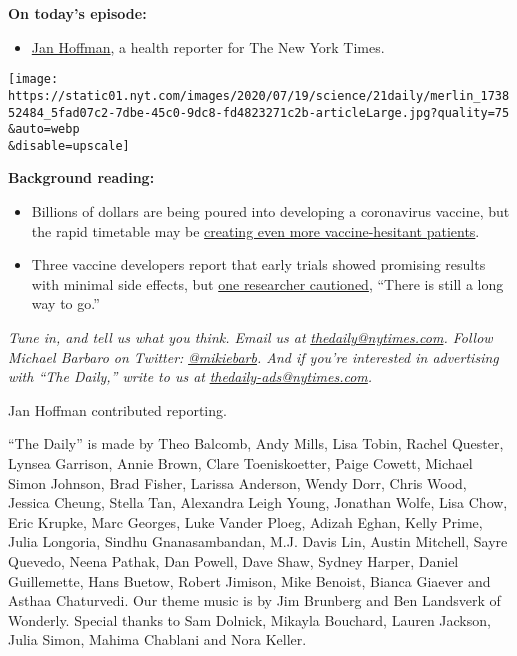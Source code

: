 \textbf{On today's episode:}

\begin{itemize}
\tightlist
\item
  \href{https://www.nytimes.com/by/jan-hoffman}{Jan Hoffman}, a health
  reporter for The New York Times.
\end{itemize}

\texttt{[image: https://static01.nyt.com/images/2020/07/19/science/21daily/merlin\_173852484\_5fad07c2-7dbe-45c0-9dc8-fd4823271c2b-articleLarge.jpg?quality=75\\\&auto=webp\\\&disable=upscale]}

\textbf{Background reading:}

\begin{itemize}
\item
  Billions of dollars are being poured into developing a coronavirus
  vaccine, but the rapid timetable may be
  \href{https://www.nytimes.com/2020/07/18/health/coronavirus-anti-vaccine.html}{creating
  even more vaccine-hesitant patients}.
\item
  Three vaccine developers report that early trials showed promising
  results with minimal side effects, but
  \href{https://www.nytimes.com/2020/07/20/world/covid-coronavirus-vaccine.html}{one
  researcher cautioned}, ``There is still a long way to go.''
\end{itemize}

\emph{Tune in, and tell us what you think. Email us at}
\href{mailto:thedaily@nytimes.com}{\emph{thedaily@nytimes.com}}\emph{.
Follow Michael Barbaro on Twitter:}
\href{https://twitter.com/mikiebarb}{\emph{@mikiebarb}}\emph{. And if
you're interested in advertising with ``The Daily,'' write to us at}
\href{mailto:thedaily-ads@nytimes.com}{\emph{thedaily-ads@nytimes.com}}\emph{.}

Jan Hoffman contributed reporting.

``The Daily'' is made by Theo Balcomb, Andy Mills, Lisa Tobin, Rachel
Quester, Lynsea Garrison, Annie Brown, Clare Toeniskoetter, Paige
Cowett, Michael Simon Johnson, Brad Fisher, Larissa Anderson, Wendy
Dorr, Chris Wood, Jessica Cheung, Stella Tan, Alexandra Leigh Young,
Jonathan Wolfe, Lisa Chow, Eric Krupke, Marc Georges, Luke Vander Ploeg,
Adizah Eghan, Kelly Prime, Julia Longoria, Sindhu Gnanasambandan, M.J.
Davis Lin, Austin Mitchell, Sayre Quevedo, Neena Pathak, Dan Powell,
Dave Shaw, Sydney Harper, Daniel Guillemette, Hans Buetow, Robert
Jimison, Mike Benoist, Bianca Giaever and Asthaa Chaturvedi. Our theme
music is by Jim Brunberg and Ben Landsverk of Wonderly. Special thanks
to Sam Dolnick, Mikayla Bouchard, Lauren Jackson, Julia Simon, Mahima
Chablani and Nora Keller.

